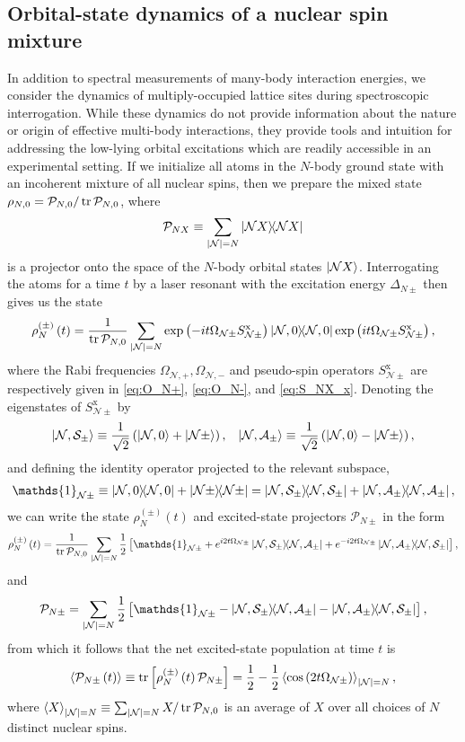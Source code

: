\documentclass[preprint,showkeys,nofootinbib]{revtex4-1}
\newcommand{\f}{\dfrac} %
\newcommand{\p}[1]{\left(#1\right)} %
\renewcommand{\sp}[1]{\left[#1\right]} %
\newcommand{\bk}{\braket} %
\newcommand{\x}{\text{x}}
\newcommand{\A}{\mathcal{A}}
\newcommand{\N}{\mathcal{N}}
\renewcommand{\P}{\mathcal{P}}
\renewcommand{\S}{\mathcal{S}}
\newcommand{\1}{\mathds{1}}
\begin{document}
\subsection{Orbital-state dynamics of a nuclear spin mixture}

In addition to spectral measurements of many-body interaction
energies, we consider the dynamics of multiply-occupied lattice sites
during spectroscopic interrogation.  While these dynamics do not
provide information about the nature or origin of effective multi-body
interactions, they provide tools and intuition for addressing the
low-lying orbital excitations which are readily accessible in an
experimental setting.  If we initialize all atoms in the $N$-body
ground state with an incoherent mixture of all nuclear spins, then we
prepare the mixed state $\rho_{N,0}=\P_{N,0}/\tr\P_{N,0}$, where
\begin{align}
  \P_{NX} \equiv \sum_{\abs{\N}=N}\op{\N X}
  \label{eq:P_NX}
\end{align}
is a projector onto the space of the $N$-body orbital states
$\ket{\N X}$.  Interrogating the atoms for a time $t$ by a laser
resonant with the excitation energy $\Delta_{N\pm}$ then gives us the
state
\begin{align}
  \rho_N^{(\pm)}\p{t} = \f1{\tr\P_{N,0}}
  \sum_{\abs{\N}=N} \exp\p{-it\Omega_{\N\pm}S_{\N\pm}^\x}
  \op{\N,0} \exp\p{it\Omega_{\N\pm}S_{\N\pm}^\x},
\end{align}
where the Rabi frequencies $\Omega_{\N,+},\Omega_{\N,-}$ and
pseudo-spin operators $S_{\N\pm}^\x$ are respectively given in
\eqref{eq:O_N+}, \eqref{eq:O_N-}, and \eqref{eq:S_NX_x}.  Denoting the
eigenstates of $S_{\N\pm}^\x$ by
\begin{align}
  \ket{\N,\S_\pm} \equiv \f1{\sqrt2} \p{\ket{\N,0} + \ket{\N\pm}},
  &&
  \ket{\N,\A_\pm} \equiv \f1{\sqrt2} \p{\ket{\N,0} - \ket{\N\pm}},
\end{align}
and defining the identity operator projected to the relevant subspace,
\begin{align}
  \1_{\N\pm} \equiv \op{\N,0} + \op{\N\pm}
  = \op{\N,\S_\pm} + \op{\N,\A_\pm},
\end{align}
we can write the state $\rho_N^{(\pm)}\p{t}$ and excited-state
projectors $\P_{N\pm}$ in the form
\begin{align}
  \rho_N^{(\pm)}\p{t} = \f1{\tr\P_{N,0}} \sum_{\abs{\N}=N} \f12
  \sp{\1_{\N\pm} + e^{i2t\Omega_{\N\pm}}\op{\N,\S_\pm}{\N,\A_\pm}
    + e^{-i2t\Omega_{\N\pm}}\op{\N,\A_\pm}{\N,\S_\pm}},
  \label{eq:rho_N_pm_t}
\end{align}
and
\begin{align}
  \P_{N\pm} = \sum_{\abs{\N}=N} \f12
  \sp{\1_{\N\pm}-\op{\N,\S_\pm}{\N,\A_\pm}-\op{\N,\A_\pm}{\N,\S_\pm}},
\end{align}
from which it follows that the net excited-state population at time
$t$ is
\begin{align}
  \bk{\P_{N\pm}\p{t}}
  \equiv \tr\sp{\rho_N^{(\pm)}\p{t}\P_{N\pm}}
  = \f12 - \f12 \bk{\cos\p{2t\Omega_{\N\pm}}}_{\abs{\N}=N},
  \label{eq:P_N_pm_t}
\end{align}
where $\bk{X}_{\abs{\N}=N}\equiv\sum_{\abs{\N}=N}X/\tr\P_{N,0}$ is an
average of $X$ over all choices of $N$ distinct nuclear spins.
\end{document}
